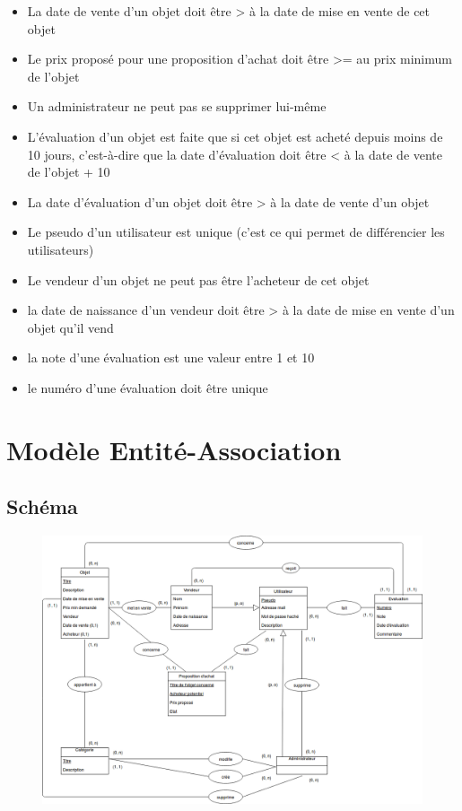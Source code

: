 \documentclass[a4paper,11pt]{article}
\begin{document}
\begin{itemize} [label=\textbullet]
	\item La date de vente d'un objet doit être > à la date de mise en vente de cet objet
	\item Le prix proposé pour une proposition d'achat doit être >= au prix minimum de l'objet
	\item Un administrateur ne peut pas se supprimer lui-même
	\item L'évaluation d'un objet est faite que si cet objet est acheté depuis moins de 10 jours, c'est-à-dire que la date d'évaluation doit être < à
	la date de vente de l'objet + 10
	\item La date d'évaluation d'un objet doit être > à la date de vente d'un objet
	\item Le pseudo d'un utilisateur est unique (c'est ce qui permet de différencier les utilisateurs)
	\item Le vendeur d'un objet ne peut pas être l'acheteur de cet objet
	\item la date de naissance d'un vendeur doit être > à la date de mise en vente d'un objet qu'il vend
	\item la note d'une évaluation est une valeur entre 1 et 10
	\item le numéro d'une évaluation doit être unique
	
\end{itemize}

\section{Modèle Entité-Association}
\subsection{Schéma}
\begin{center}
  \begin{figure}
    \includegraphics[width = 25cm]{schemaEA}
  \end{figure}
\end{center}
\end{document}
